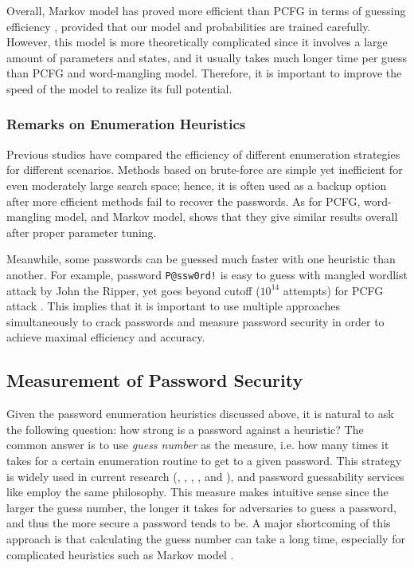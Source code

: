 \documentclass{article} %
\theoremstyle{definition}
\theoremstyle{theorem}
\theoremstyle{remark}
\theoremstyle{remark}
\begin{document}
\par\quad Overall, Markov model has proved more efficient than PCFG in terms of guessing efficiency \cite{guessability}, provided that our model and probabilities are trained carefully. However, this model is more theoretically complicated since it involves a large amount of parameters and states, and it usually takes much longer time per guess than PCFG and word-mangling model. Therefore, it is important to improve the speed of the model to realize its full potential.

\subsubsection{Remarks on Enumeration Heuristics}
\par\quad Previous studies have compared the efficiency of different enumeration strategies for different scenarios. Methods based on brute-force are simple yet inefficient for even moderately large search space; hence, it is often used as a backup option after more efficient methods fail to recover the passwords. As for PCFG, word-mangling model, and Markov model, \cite{guessability} shows that they give similar results overall after proper parameter tuning.

\par\quad Meanwhile, some passwords can be guessed much faster with one heuristic than another. For example, password \texttt{P@ssw0rd!} is easy to guess with mangled wordlist attack by John the Ripper, yet goes beyond cutoff ($10^{14}$ attempts) for PCFG attack \cite{guessability}. This implies that it is important to use multiple approaches simultaneously to crack passwords and measure password security in order to achieve maximal efficiency and accuracy.

\subsection{Measurement of Password Security}
\par\quad Given the password enumeration heuristics discussed above, it is natural to ask the following question: how strong is a password against a heuristic? The common answer is to use \emph{guess number} as the measure, i.e. how many times it takes for a certain enumeration routine to get to a given password. This strategy is widely used in current research (\cite{empirical}, \cite{omen}, \cite{againagain}, \cite{addbang}, and \cite{guessability}), and password guessability services like \cite{cmu-guessability} employ the same philosophy. This measure makes intuitive sense since the larger the guess number, the longer it takes for adversaries to guess a password, and thus the more secure a password tends to be. A major shortcoming of this approach is that calculating the guess number can take a long time, especially for complicated heuristics such as Markov model \cite{probabilistic}.
\end{document}
